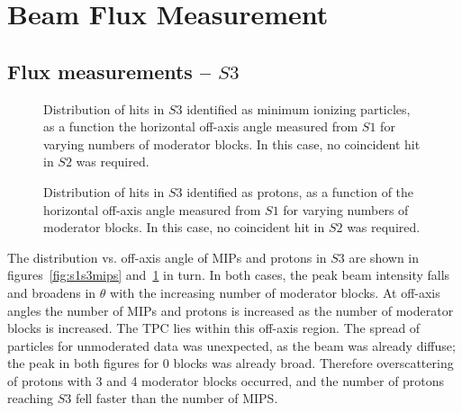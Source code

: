 \section{Beam Flux Measurement}
\label{hptpcPaper:sec:Results}

\subsection{Flux measurements -- $\mathit{S3}$}
  
  \begin{figure}[h]
    \begin{minipage}{0.48\textwidth}
      \begin{adjustbox}{max totalsize={\textwidth}{.35\textheight},center}
	
      \end{adjustbox}
      \caption{Distribution of hits in $\mathit{S3}$ identified as minimum ionizing particles, as a function the horizontal off-axis angle measured from $\mathit{S1}$ for varying numbers of moderator blocks. In this case, no coincident hit in $\mathit{S2}$ was required.}
      \label{fig:s1s3mips}
    \end{minipage}
    \hspace{0.3cm}
    \begin{minipage}{0.48\textwidth}
      \begin{adjustbox}{max totalsize={\textwidth}{.35\textheight},center}
	
      \end{adjustbox}
      \caption{Distribution of hits in $\mathit{S3}$ identified as protons, as a function of the horizontal off-axis angle measured from $\mathit{S1}$ for varying numbers of moderator blocks. In this case, no coincident hit in $\mathit{S2}$ was required.}
      \label{fig:s1s3protons}
    \end{minipage}
  \end{figure}

  The distribution vs. off-axis angle of MIPs and protons in $\mathit{S3}$ are shown in figures~\ref{fig:s1s3mips} and~\ref{fig:s1s3protons} in turn. 
  In both cases, the peak beam intensity falls and broadens in $\theta$ with the increasing number of moderator blocks. 
  At off-axis angles the number of MIPs and protons is increased as the number of moderator blocks is increased.
  The TPC lies within this off-axis region.
  The spread of particles for unmoderated data was unexpected, as the beam was already diffuse; the peak in both figures for 0 blocks was already broad.
  Therefore overscattering of protons with 3 and 4 moderator blocks occurred, and the number of protons reaching $\mathit{S3}$ fell faster than the number of MIPS.

